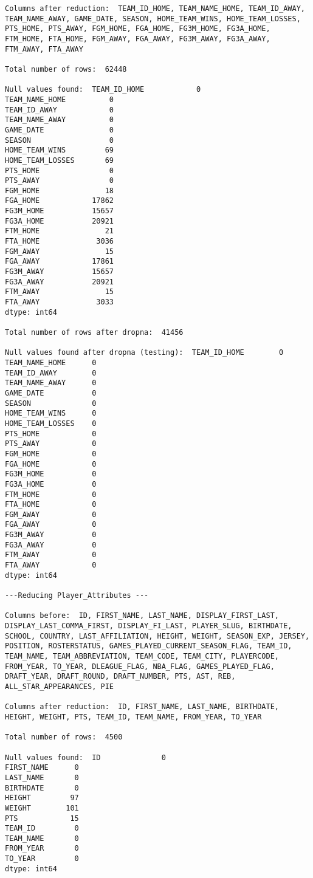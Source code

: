 \documentclass{article}
\begin{document}
\begin{lstlisting}
Columns after reduction:  TEAM_ID_HOME, TEAM_NAME_HOME, TEAM_ID_AWAY, TEAM_NAME_AWAY, GAME_DATE, SEASON, HOME_TEAM_WINS, HOME_TEAM_LOSSES, PTS_HOME, PTS_AWAY, FGM_HOME, FGA_HOME, FG3M_HOME, FG3A_HOME, FTM_HOME, FTA_HOME, FGM_AWAY, FGA_AWAY, FG3M_AWAY, FG3A_AWAY, FTM_AWAY, FTA_AWAY 

Total number of rows:  62448 

Null values found:  TEAM_ID_HOME            0
TEAM_NAME_HOME          0
TEAM_ID_AWAY            0
TEAM_NAME_AWAY          0
GAME_DATE               0
SEASON                  0
HOME_TEAM_WINS         69
HOME_TEAM_LOSSES       69
PTS_HOME                0
PTS_AWAY                0
FGM_HOME               18
FGA_HOME            17862
FG3M_HOME           15657
FG3A_HOME           20921
FTM_HOME               21
FTA_HOME             3036
FGM_AWAY               15
FGA_AWAY            17861
FG3M_AWAY           15657
FG3A_AWAY           20921
FTM_AWAY               15
FTA_AWAY             3033
dtype: int64 

Total number of rows after dropna:  41456 

Null values found after dropna (testing):  TEAM_ID_HOME        0
TEAM_NAME_HOME      0
TEAM_ID_AWAY        0
TEAM_NAME_AWAY      0
GAME_DATE           0
SEASON              0
HOME_TEAM_WINS      0
HOME_TEAM_LOSSES    0
PTS_HOME            0
PTS_AWAY            0
FGM_HOME            0
FGA_HOME            0
FG3M_HOME           0
FG3A_HOME           0
FTM_HOME            0
FTA_HOME            0
FGM_AWAY            0
FGA_AWAY            0
FG3M_AWAY           0
FG3A_AWAY           0
FTM_AWAY            0
FTA_AWAY            0
dtype: int64 

---Reducing Player_Attributes ---

Columns before:  ID, FIRST_NAME, LAST_NAME, DISPLAY_FIRST_LAST, DISPLAY_LAST_COMMA_FIRST, DISPLAY_FI_LAST, PLAYER_SLUG, BIRTHDATE, SCHOOL, COUNTRY, LAST_AFFILIATION, HEIGHT, WEIGHT, SEASON_EXP, JERSEY, POSITION, ROSTERSTATUS, GAMES_PLAYED_CURRENT_SEASON_FLAG, TEAM_ID, TEAM_NAME, TEAM_ABBREVIATION, TEAM_CODE, TEAM_CITY, PLAYERCODE, FROM_YEAR, TO_YEAR, DLEAGUE_FLAG, NBA_FLAG, GAMES_PLAYED_FLAG, DRAFT_YEAR, DRAFT_ROUND, DRAFT_NUMBER, PTS, AST, REB, ALL_STAR_APPEARANCES, PIE 

Columns after reduction:  ID, FIRST_NAME, LAST_NAME, BIRTHDATE, HEIGHT, WEIGHT, PTS, TEAM_ID, TEAM_NAME, FROM_YEAR, TO_YEAR 

Total number of rows:  4500 

Null values found:  ID              0
FIRST_NAME      0
LAST_NAME       0
BIRTHDATE       0
HEIGHT         97
WEIGHT        101
PTS            15
TEAM_ID         0
TEAM_NAME       0
FROM_YEAR       0
TO_YEAR         0
dtype: int64 


\end{lstlisting}
\end{document}
